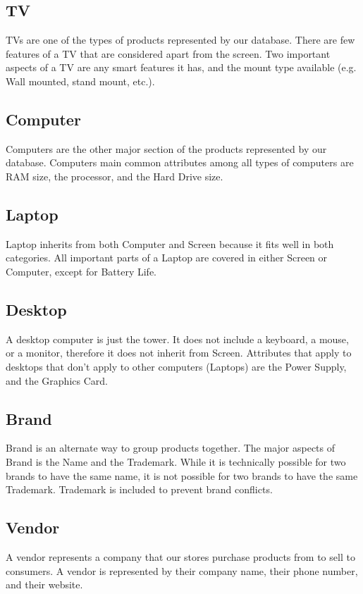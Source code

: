 \documentclass[12pt]{article}
\begin{document}
		\subsection{TV}
			TVs are one of the types of products represented by our database. There
			are few features of a TV that are considered apart from the screen. Two
			important aspects of a TV are any smart features it has, and the mount
			type available (e.g. Wall mounted, stand mount, etc.).

		\subsection{Computer}
			Computers are the other major section of the products represented by our
			database. Computers main common attributes among all types of computers
			are RAM size, the processor, and the Hard Drive size. 


		\subsection{Laptop}
			Laptop inherits from both Computer and Screen because it fits well in both
			categories. All important parts of a Laptop are covered in either Screen
			or Computer, except for Battery Life.

		\subsection{Desktop}
			A desktop computer is just the tower. It does not include a keyboard, a
			mouse, or a monitor, therefore it does not inherit from Screen. Attributes
			that apply to desktops that don't apply to other computers (Laptops) are
			the Power Supply, and the Graphics Card.

		\subsection{Brand}
			Brand is an alternate way to group products together. The major aspects of
			Brand is the Name and the Trademark. While it is technically possible for
			two brands to have the same name, it is not possible for two brands to
			have the same Trademark. Trademark is included to prevent brand conflicts.

		\subsection{Vendor}
			A vendor represents a company that our stores purchase products from to
			sell to consumers. A vendor is represented by their company name, their
			phone number, and their website.
\end{document}
